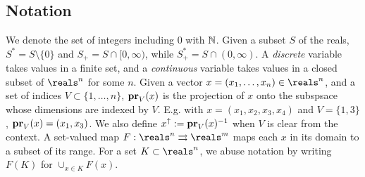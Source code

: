 \subsection{Notation}
We denote the set of integers including 0 with $\Ne$. 
Given a subset $S$ of the reals, $S^* = S \setminus \{0\}$ and $S_+ = S \cap [0,\infty)$,
while $S_+^* = S \cap (0,\infty)$.
A \emph{discrete} variable takes values in a finite set, and a \emph{continuous} variable takes values in a closed subset of $\reals^n$ for some $n$.
Given a vector $x = (x_1,\ldots,x_n) \in \reals^n$, and a set of indices $V \subset \{1,\ldots,n\}$, $\proj{x}{V}$ is the projection of $x$ onto the subspsace whose dimensions are indexed by $V$. 
E.g. with $x = (x_1,x_2,x_3,x_4)$ and $V=\{1,3\}$, $\proj{x}{V} = (x_1,x_3)$.
We also define $x^\uparrow \defeq \proj{x}{V}^{-1}$ when $V$ is clear from the context.
A set-valued map $F: \reals^n \rightrightarrows \reals^m$ maps each $x$ in its domain to a subset of its range.
For a set $K \subset \reals^n$, we abuse notation by writing $F(K)$ for $\cup_{x\in K}F(x)$.